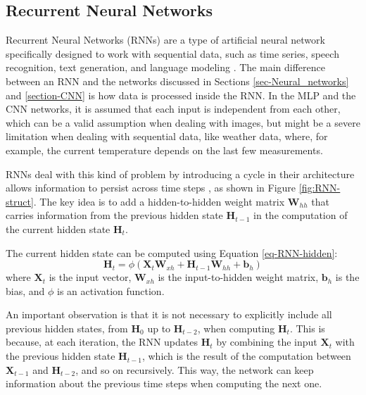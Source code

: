 \subsection{Recurrent Neural Networks} \label{section-RNN}

Recurrent Neural Networks (RNNs) are a type of artificial neural network specifically designed to work with sequential data, such as time series, speech recognition, text generation, and language modeling \cite{fang-wei,Alzubaidi_Zhang_Humaidi_Al_Dujaili_Duan_Al_Shamma_Santamaria_Fadhel_Al_Amidie_Farhan_2021}. The main difference between an RNN and the networks discussed in Sections \ref{sec-Neural_networks} and \ref{section-CNN} is how data is processed inside the RNN. In the MLP and the CNN networks, it is assumed that each input is independent from each other, which can be a valid assumption when dealing with images, but might be a severe limitation when dealing with sequential data, like weather data, where, for example, the current temperature depends on the last few measurements.

RNNs deal with this kind of problem by introducing a cycle in their architecture  allows information to persist across time steps \cite{schmidt2019recurrentneuralnetworksrnns}, as shown in Figure \ref{fig:RNN-struct}. The key idea is to add a hidden-to-hidden weight matrix $\boldsymbol{W}_{hh}$ that carries information from the previous hidden state $\boldsymbol{H}_{t-1}$ in the computation of the current hidden state $\boldsymbol{H}_t$. 

The current hidden state can be computed using Equation \ref{eq-RNN-hidden}:
\begin{equation}
    \boldsymbol{H}_t = \phi(\boldsymbol{X}_t \boldsymbol{W}_{xh} + \boldsymbol{H}_{t-1} \boldsymbol{W}_{hh} + \boldsymbol{b}_h)
    \label{eq-RNN-hidden}
\end{equation}
where $\boldsymbol{X}_t$ is the input vector, $\boldsymbol{W}_{xh}$ is the input-to-hidden weight matrix, $\boldsymbol{b}_h$ is the bias, and $\phi$ is an activation function. 

An important observation is that it is not necessary to explicitly include all previous hidden states, from $\boldsymbol{H}_{0}$ up to $\boldsymbol{H}_{t-2}$, when computing $\boldsymbol{H}_t$. This is because, at each iteration, the RNN updates $\boldsymbol{H}_{t}$ by combining the input $\boldsymbol{X}_t$ with the previous hidden state $\boldsymbol{H}_{t-1}$, which is the result of the computation between $\boldsymbol{X}_{t-1}$ and $\boldsymbol{H}_{t-2}$, and so on recursively. This way, the network can keep information about the previous time steps when computing the next one.

